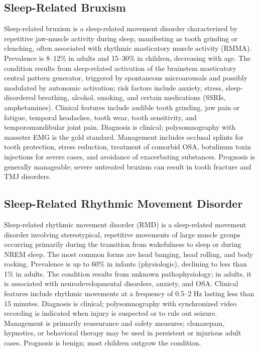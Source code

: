 \subsection{Sleep-Related Bruxism}
\label{sec:Sleep-Related Bruxism}
Sleep-related bruxism is a sleep-related movement disorder characterized by repetitive jaw-muscle activity during sleep, manifesting as tooth grinding or clenching, often associated with rhythmic masticatory muscle activity (RMMA). Prevalence is 8--12\% in adults and 15--30\% in children, decreasing with age. The condition results from sleep-related activation of the brainstem masticatory central pattern generator, triggered by spontaneous microarousals and possibly modulated by autonomic activation; risk factors include anxiety, stress, sleep-disordered breathing, alcohol, smoking, and certain medications (SSRIs, amphetamines). Clinical features include audible tooth grinding, jaw pain or fatigue, temporal headaches, tooth wear, tooth sensitivity, and temporomandibular joint pain. Diagnosis is clinical; polysomnography with masseter EMG is the gold standard. Management includes occlusal splints for tooth protection, stress reduction, treatment of comorbid OSA, botulinum toxin injections for severe cases, and avoidance of exacerbating substances. Prognosis is generally manageable; severe untreated bruxism can result in tooth fracture and TMJ disorders.

\subsection{Sleep-Related Rhythmic Movement Disorder}
\label{sec:Sleep-Related Rhythmic Movement Disorder}
Sleep-related rhythmic movement disorder (RMD) is a sleep-related movement disorder involving stereotypical, repetitive movements of large muscle groups occurring primarily during the transition from wakefulness to sleep or during NREM sleep. The most common forms are head banging, head rolling, and body rocking. Prevalence is up to 60\% in infants (physiologic), declining to less than 1\% in adults. The condition results from unknown pathophysiology; in adults, it is associated with neurodevelopmental disorders, anxiety, and OSA. Clinical features include rhythmic movements at a frequency of 0.5--2 Hz lasting less than 15 minutes. Diagnosis is clinical; polysomnography with synchronized video recording is indicated when injury is suspected or to rule out seizure. Management is primarily reassurance and safety measures; clonazepam, hypnotics, or behavioral therapy may be used in persistent or injurious adult cases. Prognosis is benign; most children outgrow the condition.

